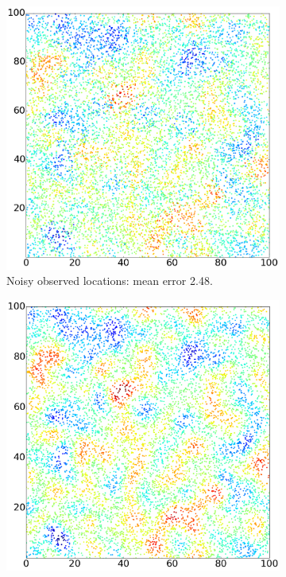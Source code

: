 \documentclass{article}
\begin{document}
\begin{figure}
 \centering
 \begin{subfigure}[t]{.215\textwidth}
         \includegraphics[width=\textwidth]{synth_init_X}
         \caption{Noisy observed locations: mean error 2.48.}
         \label{fig:synthX}
     \end{subfigure}\hspace{0.5em}  
\begin{subfigure}[t]{.21\textwidth}
        \includegraphics[width=\textwidth]{synth_fullgp}

\end{subfigure}
\end{figure}
\end{document}
